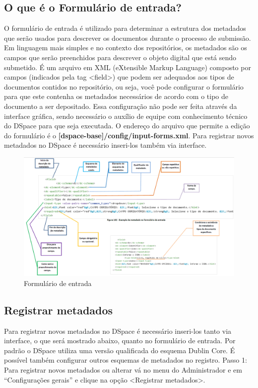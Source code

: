\documentclass[12pt,hidelinks]{article}
\begin{document}
    \subsection{O que é o Formulário de entrada?}
O formulário de entrada é utilizado para determinar a estrutura dos metadados que serão usados para descrever os documentos durante o processo de submissão.
\singlespacing
Em linguagem mais simples e no contexto dos repositórios, os metadados são os campos que serão preenchidos para descrever o objeto digital que está sendo submetido.
É um arquivo em XML (eXtensible Markup Language) composto por campos (indicados pela tag <field>) que podem ser adequados aos tipos de documentos contidos no repositório, ou seja, você pode configurar o formulário para que este contenha os metadados necessários de acordo com o tipo de documento a ser depositado.
\singlespacing
Essa configuração não pode ser feita através da interface gráfica, sendo necessário o auxílio de equipe com conhecimento técnico do DSpace para que seja executada.
O endereço do arquivo que permite a edição do formulário é o \textbf{[dspace-base]/config/input-forms.xml}. Para registrar novos metadados no DSpace é necessário inseri-los também via interface.

        \begin{figure}[!htp]
                \centering
                \includegraphics[scale=0.4]{figura/input-forms.png}
                \caption{Formulário de entrada}
            \label{Rotulo}
          \end{figure}
\newpage
    \subsection{Registrar metadados}
Para registrar novos metadados no DSpace é necessário inseri-los tanto via interface, o que será mostrado abaixo, quanto no formulário de entrada. Por padrão o DSpace utiliza uma versão qualificada do esquema Dublin Core. É possível também configurar outros esquemas de metadados no registro.
\singlespacing
Passo 1: Para registrar novos metadados ou alterar vá no menu do Administrador e em “Configurações gerais” e clique na opção <Registrar metadados>.
    
\end{document}

